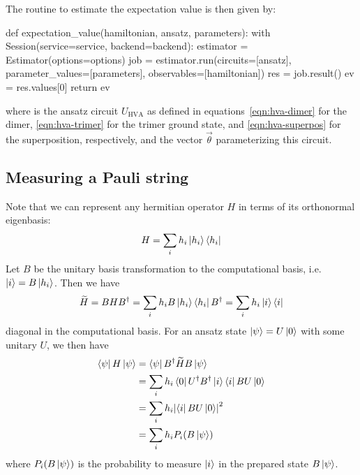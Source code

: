 \documentclass[a4paper,12pt]{article}
\newcommand{\nnl}{\nonumber\\}
\begin{document}
%
The routine to estimate the expectation value is then given by:
\begin{python}
def expectation_value(hamiltonian, ansatz, parameters):
    with Session(service=service, backend=backend):
        estimator = Estimator(options=options)
        job = estimator.run(circuits=[ansatz],
              parameter_values=[parameters],
              observables=[hamiltonian])
        res = job.result()
    ev = res.values[0]
    return ev
\end{python}
where  is the ansatz circuit $U_\text{HVA}$ as defined in equations~\eqref{eqn:hva-dimer} for the dimer, \eqref{eqn:hva-trimer} for the trimer ground state, and \eqref{eqn:hva-superpos} for the superposition, respectively, and  the vector $\vec\theta$ parameterizing this circuit.

\subsection{Measuring a Pauli string}
Note that we can represent any hermitian operator $H$ in terms of its orthonormal eigenbasis:
\begin{equation}
H = \sum_i h_i \left\vert{h_i}\right\rangle\left\langle{h_i}\right\vert
\end{equation}
Let $B$ be the unitary basis transformation to the computational basis, i.e. $\left\vert{i}\right\rangle = B \left\vert{h_i}\right\rangle$. Then we have
\begin{equation}
 \widetilde{H} = B H B^\dagger
 = \sum_i h_i B \left\vert{h_i}\right\rangle \left\langle{h_i}\right\vert B^\dagger
 = \sum_i h_i \left\vert{i}\right\rangle \left\langle{i}\right\vert
\end{equation}
diagonal in the computational basis.
For an ansatz state $\left\vert{\psi}\right\rangle = U \left\vert{0}\right\rangle$ with some unitary $U$, we then have
\begin{align}
\bra{\psi} H \ket{\psi}
&= \bra{\psi} B^\dagger \widetilde{H} B \ket{\psi} \nnl
&= \sum_i h_i \bra{0} U^\dagger B^\dagger  \ket{i}\bra{i} B U \ket{0} \nnl
&= \sum_i h_i \abs{\bra{i} B U \ket{0}}^2 \nnl 
&= \sum_i h_i P_i(B \ket{\psi})
\end{align}
where $P_i(B \left\vert{\psi}\right\rangle)$ is the probability to measure $\left\vert{i}\right\rangle$ in the prepared state $B \left\vert{\psi}\right\rangle$.
\end{document}
